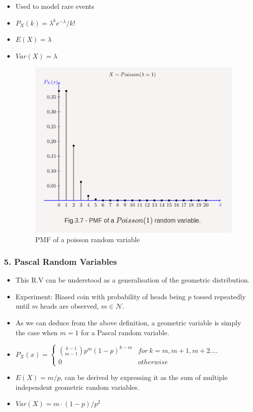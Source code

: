 \begin{itemize}
\item
  Used to model rare events
\item
  \(P_X(k) = \lambda^ke^{-\lambda}/k!\)
\item
  \(E(X) = \lambda\)
\item
  \(Var(X) =\lambda\)

  \begin{figure}
  \centering
  \includegraphics{Lecture 13 Notes e842fef9a3e0449fa78bac59b75dbc5c/Screenshot_from_2021-08-06_23-13-10.png}
  \caption{PMF of a poisson random variable}
  \end{figure}
\end{itemize}

\hypertarget{pascal-random-variables}{%
\subsubsection{5. Pascal Random
Variables}\label{pascal-random-variables}}

\begin{itemize}
\item
  This R.V can be understood as a generalisation of the geometric
  distribution.
\item
  Experiment: Biased coin with probability of heads being \(p\) tossed
  repeatedly until \(m\) heads are observed, \(m \in \mathcal{N}\).
\item
  As we can deduce from the above definition, a geometric variable is
  simply the case when \(m = 1\) for a Pascal random variable.
\item
  \(P_X(x) = \begin{cases}{{k-1}\choose{m-1}} p^m(1-p)^{k-m} & for \ k=m, m+1, m+2....\\0 & otherwise\end{cases}\)
\item
  \(E(X) = m/p\), can be derived by expressing it as the sum of multiple
  independent geometric random variables.
\item
  \(Var(X) = m\cdot (1-p)/p^2\)
\end{itemize}

